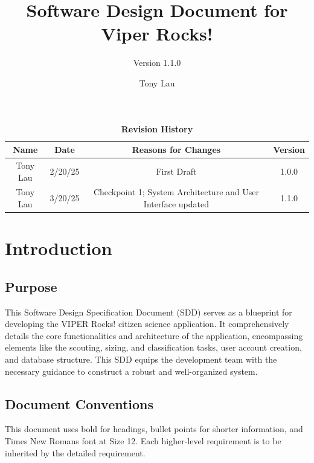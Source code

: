 \documentclass{article}
\begin{document}
\title{Software Design Document for Viper Rocks!}
\author{Version 1.1.0}
\date{Tony Lau}

\maketitle
\tableofcontents
\newpage

\fancyhf{}
\fancyfoot[C]{\thepage}

\begin{table}[h!]
\centering
\caption{\textbf{Revision History}}
\begin{tabular}{|c|c|c|c|}
\hline
\textbf{Name} & \textbf{Date} & \textbf{Reasons for Changes} & \textbf{Version} \\
\hline
Tony Lau & 2/20/25 & First Draft & 1.0.0 \\
\hline
Tony Lau & 3/20/25 & Checkpoint 1; System Architecture and User Interface updated & 1.1.0 \\
\hline

\hline

\hline
\end{tabular}
\end{table}

\section{Introduction}
\subsection{Purpose}
This Software Design Specification Document (SDD) serves as a blueprint for developing the VIPER Rocks! citizen science application. It comprehensively details the core functionalities and architecture of the application, encompassing elements like the scouting, sizing, and classification tasks, user account creation, and database structure. This SDD equips the development team with the necessary guidance to construct a robust and well-organized system.
\subsection{Document Conventions}
This document uses bold for headings, bullet points for shorter information, and Times New Romans font at Size 12. Each higher-level requirement is to be inherited by the detailed requirement.
\end{document}

